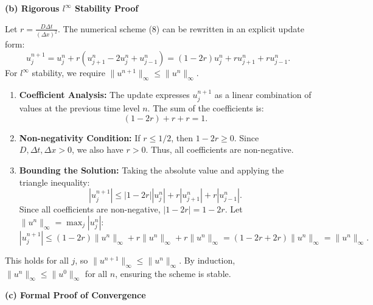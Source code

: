 \begin{solution}
\textbf{(b) Rigorous $l^\infty$ Stability Proof}

Let $r = \frac{D \Delta t}{(\Delta x)^2}$. The numerical scheme (8) can be rewritten in an explicit update form:
\begin{equation}
    u_j^{n+1} = u_j^n + r(u_{j+1}^n - 2u_j^n + u_{j-1}^n) = (1-2r)u_j^n + r u_{j+1}^n + r u_{j-1}^n. \label{eq:heat_update}
\end{equation}
For $l^\infty$ stability, we require $\|u^{n+1}\|_\infty \leq \|u^n\|_\infty$.
\begin{enumerate}
    \item \textbf{Coefficient Analysis:} The update expresses $u_j^{n+1}$ as a linear combination of values at the previous time level $n$. The sum of the coefficients is:
    \[ (1-2r) + r + r = 1. \]
    \item \textbf{Non-negativity Condition:} If $r \leq 1/2$, then $1-2r \geq 0$. Since $D, \Delta t, \Delta x > 0$, we also have $r > 0$. Thus, all coefficients are non-negative.
    \item \textbf{Bounding the Solution:} Taking the absolute value and applying the triangle inequality:
    \[ |u_j^{n+1}| \leq |1-2r| |u_j^n| + r |u_{j+1}^n| + r |u_{j-1}^n|. \]
    Since all coefficients are non-negative, $|1-2r| = 1-2r$. Let $\|u^n\|_\infty = \max_j |u_j^n|$:
    \[ |u_j^{n+1}| \leq (1-2r) \|u^n\|_\infty + r \|u^n\|_\infty + r \|u^n\|_\infty = (1-2r + 2r) \|u^n\|_\infty = \|u^n\|_\infty. \]
\end{enumerate}
This holds for all $j$, so $\|u^{n+1}\|_\infty \leq \|u^n\|_\infty$. By induction, $\|u^n\|_\infty \leq \|u^0\|_\infty$ for all $n$, ensuring the scheme is stable. 

\textbf{(c) Formal Proof of Convergence}


\end{solution}
